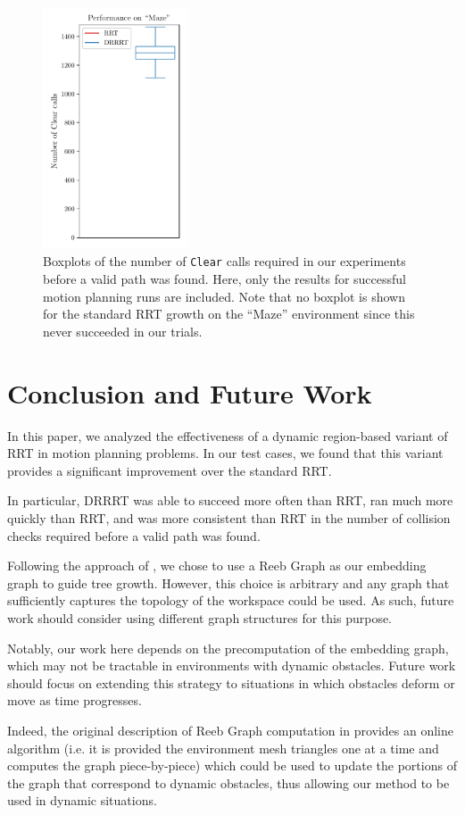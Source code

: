 \documentclass[conference]{IEEEtran}
\begin{document}
\begin{figure}[h]
	\includegraphics[width=4.3cm]{figures/maze_boxplot.pdf}
	\caption{Boxplots of the number of \texttt{Clear} calls required in our experiments before a valid path was found. Here, only the results for successful motion planning runs are included. Note that no boxplot is shown for the standard RRT growth on the ``Maze'' environment since this never succeeded in our trials.}
	\label{fig:results_boxplots}
\end{figure}

\section{Conclusion and Future Work}

In this paper, we analyzed the effectiveness of a dynamic region-based variant of RRT in motion planning problems. In our test cases, we found that this variant provides a significant improvement over the standard RRT.

In particular, DRRRT was able to succeed more often than RRT, ran much more quickly than RRT, and was more consistent than RRT in the number of collision checks required before a valid path was found.

Following the approach of \cite{DRRRT}, we chose to use a Reeb Graph as our embedding graph to guide tree growth. However, this choice is arbitrary and any graph that sufficiently captures the topology of the workspace could be used. As such, future work should consider using different graph structures for this purpose.

Notably, our work here depends on the precomputation of the embedding graph, which may not be tractable in environments with dynamic obstacles. Future work should focus on extending this strategy to situations in which obstacles deform or move as time progresses.

Indeed, the original description of Reeb Graph computation in \cite{ReebGraphs} provides an online algorithm (i.e. it is provided the environment mesh triangles one at a time and computes the graph piece-by-piece) which could be used to update the portions of the graph that correspond to dynamic obstacles, thus allowing our method to be used in dynamic situations.
\end{document}
